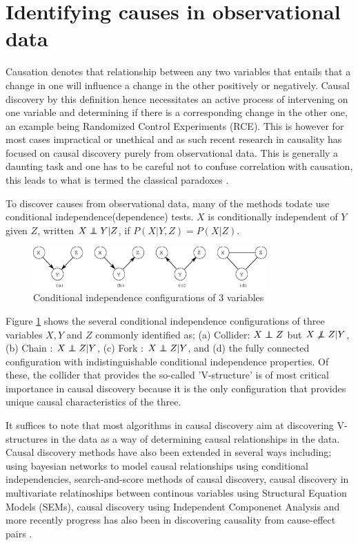 \documentclass{esannV2}
\newcommand\independent{\protect\mathpalette{\protect\independenT}{\perp}}
\def\independenT#1#2{\mathrel{\rlap{$#1#2$}\mkern2mu{#1#2}}}
\def\ci{\independent}
\def\dep{\not\independent}
\begin{document}
\section{Identifying causes in observational data}
\label{sec:IdentifyingCausesInObservationalData}

Causation denotes that relationship between any two variables that entails that a change in one will influence a change in the other positively or negatively. Causal discovery by this definition hence necessitates an active process of intervening on one variable and determining if there is a corresponding change in the other one, an example being Randomized Control Experiments (RCE). This is however for most cases impractical or unethical and as such recent research in causality has focused on causal discovery purely from observational data. This is generally a daunting task and one has to be careful not to confuse correlation with causation, this leads to what is termed the classical paradoxes \cite{06}.

To discover causes from observational data, many of the methods todate use conditional independence(dependence) tests. $X$ is conditionally independent of $Y$ given $Z$, written $X \ci Y | Z$, if $P(X|Y,Z) = P(X|Z)$. 

\begin{figure}[!h]
	\centering
		\includegraphics[width=0.80\textwidth]{vstructure.eps}
	\caption{Conditional independence configurations of 3 variables}
	\label{fig:vstructure}
\end{figure}

Figure \ref{fig:vstructure} shows the several conditional independence configurations of three variables $X,Y$ and $Z$ commonly identified as; (a) Collider: $X \ci Z$ but $X \dep Z | Y$, (b) Chain : $X \ci Z | Y$, (c) Fork : $X \ci Z | Y$, and (d) the fully connected configuration with indistinguishable conditional independence properties. Of these, the collider that provides the so-called 'V-structure' is of most critical importance in causal discovery because it is the only configuration that provides unique causal characteristics of the three. 

It suffices to note that most algorithms in causal discovery aim at discovering V-structures in the data as a way of determining causal relationships in the data. Causal discovery methods have also been extended in several ways including; using bayesian networks to model causal relationships using conditional independencies, search-and-score methods of causal discovery, causal discovery in multivariate relatinoships between continous variables using Structural Equation Models (SEMs), causal discovery using Independent Componenet Analysis and more recently progress has also been in discovering causality from cause-effect pairs \cite{15,14}.
\end{document}
